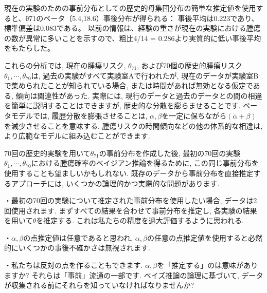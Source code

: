 \documentclass[10pt,dvipdfmx,a4]{beamer}
\begin{document}

\begin{frame}
現在の実験のための事前分布としての歴史的母集団分布の簡単な推定値を使用すると、θ71のベータ（5.4,18.6）事後分布が得られる：
事後平均は0.223であり、標準偏差は0.083である。
以前の情報は、経験の重さが現在の実験における腫瘍の数が異常に多いことを示すので、粗比4/14 = 0.286より実質的に低い事後平均をもたらした。

これらの分析では, 現在の腫瘍リスク, $\theta_{71}$, および70個の歴史的腫瘍リスク$\theta_1,\cdots, \theta_{70}$は, 過去の実験がすべて実験室Aで行われたが, 現在のデータが実験室Bで集められたことが知られている場合, または時間があれば無効となる仮定である, 傾向は関連性があった.
実際には, 現行のデータと過去のデータとの間の相違を簡単に説明することはできますが, 歴史的な分散を膨らませることです.
ベータモデルでは, 履歴分散を膨張させることは, $\alpha,\beta$を一定に保ちながら$(\alpha+\beta)$を減少させることを意味する.
腫瘍リスクの時間傾向などの他の体系的な相違は, より広範なモデルに組み込むことができます.
\end{frame}


\begin{frame}
70回の歴史的実験を用いて$\theta_{71}$の事前分布を作成した後, 最初の70回の実験$\theta_1,\cdots,\theta_{70}$における腫瘍確率のベイジアン推論を得るために, この同じ事前分布を使用することも望ましいかもしれない.
既存のデータから事前分布を直接推定するアプローチには, いくつかの論理的かつ実際的な問題があります.

・最初の70回の実験について推定された事前分布を使用したい場合, データは2回使用されます.
まずすべての結果を合わせて事前分布を推定し, 各実験の結果を用いて$\theta$を推定する.
これは私たちの精度を過大評価するように思われる.

・$\alpha,\beta$の点推定値は任意であると思われ, $\alpha,\beta$の任意の点推定値を使用すると必然的にいくつかの事後不確かさは無視されます.

・私たちは反対の点を作ることもできます.
$\alpha,\beta$を「推定する」のは意味がありますか?
それらは「事前」流通の一部です.
ベイズ推論の論理に基づいて,  データが収集される前にそれらを知っていなければなりませんか?
\end{frame}

\end{document}
